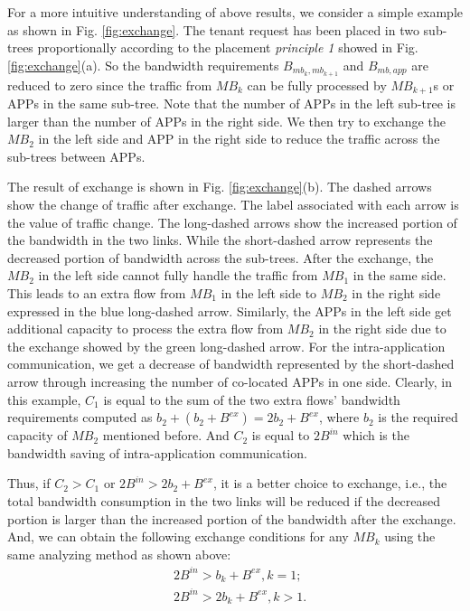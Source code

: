 \documentclass[review]{elsarticle}
\begin{document}
For a more intuitive understanding of above results, we consider a simple example as shown in Fig. \ref{fig:exchange}. The tenant request has been placed in two sub-trees proportionally according to the placement \emph{principle 1} showed in Fig. \ref{fig:exchange}(a). So the bandwidth requirements $B_{mb_k,mb_{k+1}}$ and $B_{mb,app}$ are reduced to zero since the traffic from $MB_k$ can be fully processed by $MB_{k+1}$s or APPs in the same sub-tree. Note that the number of APPs in the left sub-tree is larger than the number of APPs in the right side. We then try to exchange the $MB_2$ in the left side and APP in the right side to reduce the traffic across the sub-trees between APPs. 

The result of exchange is shown in Fig. \ref{fig:exchange}(b). The dashed arrows show the change of traffic after exchange. The label associated with each arrow is the value of traffic change. %
 The long-dashed arrows show the increased portion of the bandwidth in the two links. While the short-dashed arrow represents the decreased portion of bandwidth across the sub-trees. After the exchange, the $MB_2$ in the left side cannot fully handle the traffic from $MB_1$ in the same side. This leads to an extra flow from $MB_1$ in the left side to $MB_2$ in the right side expressed in the blue long-dashed arrow. Similarly, the APPs in the left side get additional capacity to process the extra flow from $MB_2$ in the right side due to the exchange showed by the green long-dashed arrow. For the intra-application communication, we get a decrease of bandwidth represented by the short-dashed arrow through increasing the number of co-located APPs in one side. Clearly, in this example, $C_1$ is equal to the sum of the two extra flows' bandwidth requirements computed as $b_2+(b_2+B^{ex})=2b_2+B^{ex}$, where $b_2$ is the required capacity of $MB_2$ mentioned before.
 And $C_2$ is equal to $2B^{in}$ which is the bandwidth saving of intra-application communication. 

Thus, if $C_2>C_1$ or $2B^{in} > 2b_2 + B^{ex}$, it is a better choice to exchange, i.e., the total bandwidth consumption in the two links will be reduced if the decreased portion is larger than the increased portion of the bandwidth after the exchange. And, we can obtain the following exchange conditions for any $MB_k$ using the same analyzing method as shown above: 
\begin{equation}
\begin{aligned}
&2B^{in}>b_k+B^{ex},k=1;\\
&2B^{in}>2b_k+B^{ex},k>1.
\end{aligned}
\end{equation}
\end{document}
